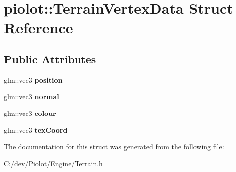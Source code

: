 \hypertarget{structpiolot_1_1_terrain_vertex_data}{}\section{piolot\+:\+:Terrain\+Vertex\+Data Struct Reference}
\label{structpiolot_1_1_terrain_vertex_data}
\subsection*{Public Attributes}
\begin{DoxyCompactItemize}
\item 
\mbox{\label{structpiolot_1_1_terrain_vertex_data_a7a00a745d0492b03adf53487960a2469}} 
glm\+::vec3 {\bfseries position}
\item 
\mbox{\label{structpiolot_1_1_terrain_vertex_data_a61e13493d45cce67d98e5c9d54bbe2ec}} 
glm\+::vec3 {\bfseries normal}
\item 
\mbox{\label{structpiolot_1_1_terrain_vertex_data_ac739ba374cf5a2e06af669c20754f143}} 
glm\+::vec3 {\bfseries colour}
\item 
\mbox{\label{structpiolot_1_1_terrain_vertex_data_ab18681a402838040b7ceb7574921e472}} 
glm\+::vec3 {\bfseries tex\+Coord}
\end{DoxyCompactItemize}


The documentation for this struct was generated from the following file\+:\begin{DoxyCompactItemize}
\item 
C\+:/dev/\+Piolot/\+Engine/Terrain.\+h\end{DoxyCompactItemize}
